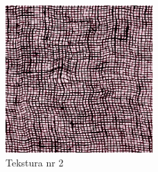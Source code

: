 \documentclass{article}
\begin{document}
            \FloatBarrier
            \begin{figure}[ht]
                \centering
                \includegraphics[width=0.5\textwidth]{images/tekstura3.png}
                \caption{Tekstura nr 2}
                \label{fig:tex3}
            \end{figure}
            \FloatBarrier
\end{document}

